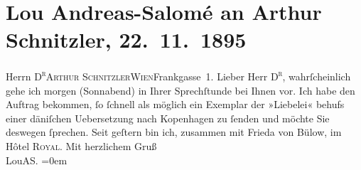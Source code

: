 

         
         \newcommand{\erwaehntePersonen}{Personen: Frieda von Bülow}
         \newcommand{\erwaehnteOrte}{Orte: Dänemark, Frankgasse, Hotel Royal, I., Innere Stadt, IX., Alsergrund, Kopenhagen, Wien}
         \newcommand{\erwaehnteWerke}{Werke: Liebelei. Schauspiel in drei Akten}
               \section[Lou Andreas-Salomé an Arthur Schnitzler, 22. 11. 1895]{ Lou Andreas-Salomé an Arthur Schnitzler, 22. 11. 1895}\nopagebreak{}\rehead{ }\begin{ledgroupsized}[t]{13cm}\normalsize\beginnumbering \toendnotes[C]{\smallbreak\pagebreak[2]} 
\pstart{}{\pb}Herrn \textsc{D\textsuperscript{r}}\pend{}\pstart{}\textsc{Arthur Schnitzler}\pend{}\pstart{}\textsc{Wien}\pend{}\pstart{}Frankgasse 1.
                    \pend{}{\bigskip}\pstart
           \noindent{}{\pb}Lieber Herr \textsc{D\textsuperscript{r}}, wahrſcheinlich gehe ich morgen (Sonnabend) in Ihrer Sprechſtunde bei
                    Ihnen vor. Ich habe den Auftrag bekommen, ſo ſchnell als möglich
                    ein Exemplar der »Liebelei« behufs einer
                        däniſchen Uebersetzung nach Kopenhagen
                    zu ſenden und möchte Sie deswegen ſprechen. Seit geſtern bin ich, zusammen mit
                        Frieda von Bülow, im Hôtel \textsc{Royal}.\pend
           \pstart
           Mit herzlichem Gruß{\\[\baselineskip]}\spacefill\mbox{LouAS.}\pend
           \leftskip=0em{}
         
         \endnumbering{}\end{ledgroupsized}  \newcommand{\dateiname}{L00514}\newcommand{\titel}{Lou Andreas-Salomé an Arthur Schnitzler, 22. 11. 1895}\newcommand{\editorInnen}{Martin Anton Müller und Gerd-Hermann Susen}
      